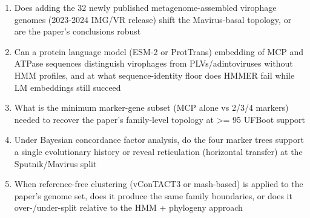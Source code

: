 \documentclass[11pt]{article}
\begin{document}
\begin{enumerate}[leftmargin=1.6em,itemsep=0.2em,topsep=0.2em,label=Q\arabic*.]
\item Does adding the 32 newly published metagenome-assembled virophage genomes (2023-2024 IMG/VR release) shift the Mavirus-basal topology, or are the paper's conclusions robust
\item Can a protein language model (ESM-2 or ProtTrans) embedding of MCP and ATPase sequences distinguish virophages from PLVs/adintoviruses without HMM profiles, and at what sequence-identity floor does HMMER fail while LM embeddings still succeed
\item What is the minimum marker-gene subset (MCP alone vs 2/3/4 markers) needed to recover the paper's family-level topology at \textgreater{}= 95 UFBoot support
\item Under Bayesian concordance factor analysis, do the four marker trees support a single evolutionary history or reveal reticulation (horizontal transfer) at the Sputnik/Mavirus split
\item When reference-free clustering (vConTACT3 or mash-based) is applied to the paper's genome set, does it produce the same family boundaries, or does it over-/under-split relative to the HMM + phylogeny approach
\end{enumerate}
\end{document}
